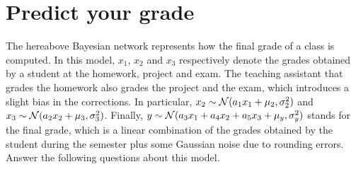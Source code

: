 \documentclass[11pt, a4paper]{article}
\begin{document}
\begin{enumerate}
\begin{solution}
\begin{figure}[h]
        \end{figure}
    \end{solution}
\end{enumerate}

\newpage

\section{Predict your grade}

\begin{figure}[h]
    \centering
\end{figure}

The hereabove Bayesian network represents how the final grade of a class is computed. In this model, $x_1$, $x_2$ and $x_3$ respectively denote the grades obtained by a student at the homework, project and exam. The teaching assistant that grades the homework also grades the project and the exam, which introduces a slight bias in the corrections. In particular, $x_2 \sim \mathcal{N}(a_1 x_1 + \mu_2, \sigma_2^2)$ and $x_3 \sim \mathcal{N}(a_2 x_2 + \mu_3, \sigma_3^2)$. Finally, $y \sim \mathcal{N}(a_3 x_1 + a_4 x_2 + a_5 x_3 + \mu_y, \sigma_y^2)$ stands for the final grade, which is a linear combination of the grades obtained by the student during the semester plus some Gaussian noise due to rounding errors. Answer the following questions about this model.
\end{document}

